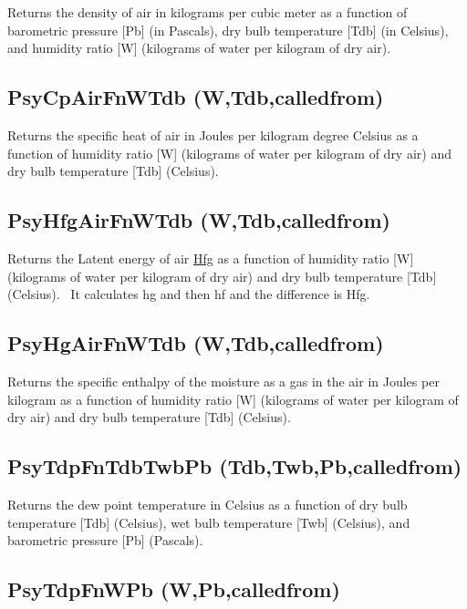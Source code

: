 Returns the density of air in kilograms per cubic meter as a function of barometric pressure {[}Pb{]} (in Pascals), dry bulb temperature {[}Tdb{]} (in Celsius), and humidity ratio {[}W{]} (kilograms of water per kilogram of dry air).

\subsection{PsyCpAirFnWTdb (W,Tdb,calledfrom)}\label{psycpairfnwtdb-wtdbcalledfrom}

Returns the specific heat of air in Joules per kilogram degree Celsius as a function of humidity ratio {[}W{]} (kilograms of water per kilogram of dry air) and dry bulb temperature {[}Tdb{]} (Celsius).

\subsection{PsyHfgAirFnWTdb (W,Tdb,calledfrom)}\label{psyhfgairfnwtdb-wtdbcalledfrom}

Returns the Latent energy of air \href{Joules\%20per\%20kilogram}{Hfg} as a function of humidity ratio {[}W{]} (kilograms of water per kilogram of dry air) and dry bulb temperature {[}Tdb{]} (Celsius).~ It calculates hg and then hf and the difference is Hfg.

\subsection{PsyHgAirFnWTdb (W,Tdb,calledfrom)}\label{psyhgairfnwtdb-wtdbcalledfrom}

Returns the specific enthalpy of the moisture as a gas in the air in Joules per kilogram as a function of humidity ratio {[}W{]} (kilograms of water per kilogram of dry air) and dry bulb temperature {[}Tdb{]} (Celsius).

\subsection{PsyTdpFnTdbTwbPb (Tdb,Twb,Pb,calledfrom)}\label{psytdpfntdbtwbpb-tdbtwbpbcalledfrom}

Returns the dew point temperature in Celsius as a function of dry bulb temperature {[}Tdb{]} (Celsius), wet bulb temperature {[}Twb{]} (Celsius), and barometric pressure {[}Pb{]} (Pascals).

\subsection{PsyTdpFnWPb (W,Pb,calledfrom)}\label{psytdpfnwpb-wpbcalledfrom}

